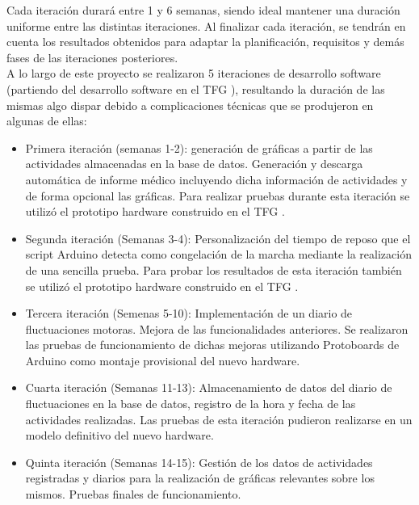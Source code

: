 Cada iteración durará entre 1 y 6 semanas, siendo ideal mantener una duración uniforme entre las distintas iteraciones. Al finalizar cada iteración, se tendrán en cuenta los resultados obtenidos para adaptar la planificación, requisitos y demás fases de las iteraciones posteriores.\\
A lo largo de este proyecto se realizaron 5 iteraciones de desarrollo software (partiendo del desarrollo software en el TFG \cite{Martos2024}), resultando la duración de las mismas algo dispar debido a complicaciones técnicas que se produjeron en algunas de ellas:
\begin{itemize}
    \item Primera iteración (semanas 1-2): generación de gráficas a partir de las actividades almacenadas en la base de datos. Generación y descarga automática de informe médico incluyendo dicha información de actividades y de forma opcional las gráficas. Para realizar pruebas durante esta iteración se utilizó el prototipo hardware construido en el TFG \cite{Martos2024}.
    \item Segunda iteración (Semanas 3-4): Personalización del tiempo de reposo que el script Arduino detecta como congelación de la marcha mediante la realización de una sencilla prueba. Para probar los resultados de esta iteración también se utilizó el prototipo hardware construido en el TFG \cite{Martos2024}.
    \item Tercera iteración (Semenas 5-10): Implementación de un diario de fluctuaciones motoras. Mejora de las funcionalidades anteriores. Se realizaron las pruebas de funcionamiento de dichas mejoras utilizando Protoboards de Arduino como montaje provisional del nuevo hardware.
    \item Cuarta iteración (Semanas 11-13): Almacenamiento de datos del diario de fluctuaciones en la base de datos, registro de la hora y fecha de las actividades realizadas. Las pruebas de esta iteración pudieron realizarse en un modelo definitivo del nuevo hardware.
    \item Quinta iteración (Semanas 14-15): Gestión de los datos de actividades registradas y diarios para la realización de gráficas relevantes sobre los mismos. Pruebas finales de funcionamiento.
\end{itemize}
